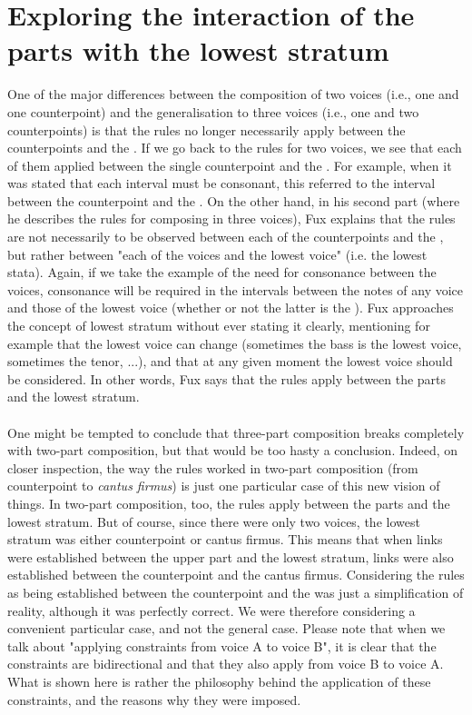 \section{Exploring the interaction of the parts with the lowest stratum}

One of the major differences between the composition of two voices (i.e., one \cf and one counterpoint) and the generalisation to three voices (i.e., one \cf and two counterpoints) is that the rules no longer necessarily apply between the counterpoints and the \cf. If we go back to the rules for two voices, we see that each of them applied between the single counterpoint and the \cf. For example, when it was stated that each interval must be consonant, this referred to the interval between the counterpoint and the \cf.
On the other hand, in his second part (where he describes the rules for composing in three voices), Fux explains that the rules are not necessarily to be observed between each of the counterpoints and the \cf, but rather between "each of the voices and the lowest voice" (i.e. the lowest stata). Again, if we take the example of the need for consonance between the voices, consonance will be required in the intervals between the notes of any voice and those of the lowest voice (whether or not the latter is the \cf).
Fux approaches the concept of lowest stratum without ever stating it clearly, mentioning for example that the lowest voice can change (sometimes the bass is the lowest voice, sometimes the tenor, ...), and that at any given moment the lowest voice should be considered. In other words, Fux says that the rules apply between the parts and the lowest stratum.

\paragraph{}
One might be tempted to conclude that three-part composition breaks completely with two-part composition, but that would be too hasty a conclusion. Indeed, on closer inspection, the way the rules worked in two-part composition (from counterpoint to \textit{cantus firmus}) is just one particular case of this new vision of things. In two-part composition, too, the rules apply between the parts and the lowest stratum. But of course, since there were only two voices, the lowest stratum was either counterpoint or cantus firmus. This means that when links were established between the upper part and the lowest stratum, links were also established between the counterpoint and the cantus firmus. Considering the rules as being established between the counterpoint and the \cf was just a simplification of reality, although it was perfectly correct. We were therefore considering a convenient particular case, and not the general case. Please note that when we talk about "applying constraints from voice A to voice B", it is clear that the constraints are bidirectional and that they also apply from voice B to voice A. What is shown here is rather the philosophy behind the application of these constraints, and the reasons why they were imposed.

